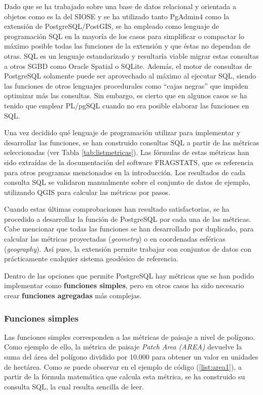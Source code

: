 Dado que se ha trabajado sobre una base de datos relacional y orientada a objetos como es la del SIOSE y se ha utilizado tanto PgAdmin4 como la extensión de PostgreSQL/PostGIS, se ha empleado como lenguaje de programación SQL en la mayoría de los casos para simplificar o compactar lo máximo posible todas las funciones de la extensión y que éstas no dependan de otras. SQL es un lenguaje estandarizado y resultaría viable migrar estas consultas a otros SGBD como Oracle Spatial o SQLite. Además, el motor de consultas de PostgreSQL solamente puede ser aprovechado al máximo al ejecutar SQL, siendo las funciones de otros lenguajes procedurales como ``cajas negras'' que impiden optimizar más las consultas. Sin embargo, es cierto que en algunos casos se ha tenido que emplear PL/pgSQL cuando no era posible elaborar las funciones en SQL.

Una vez decidido qué lenguaje de programación utilizar para implementar y desarrollar las funciones, se han construido consultas SQL a partir de las métricas seleccionadas (ver Tabla \ref{tab:listmetricas}). Las fórmulas de estas métricas han sido extraídas de la documentación del software FRAGSTATS, que es referencia para otros programas mencionados en la introducción. Los resultados de cada consulta SQL se validaron manualmente sobre el conjunto de datos de ejemplo, utilizando QGIS para calcular las métricas por pasos.

Cuando estas últimas comprobaciones han resultado satisfactorias, se ha procedido a desarrollar la función de PostgreSQL por cada una de las métricas. Cabe mencionar que todas las funciones se han desarrollado por duplicado, para calcular las métricas proyectadas (\textit{geometry}) o en coordenadas esféricas (\textit{geography}). Así pues, la extensión permite trabajar con conjuntos de datos con prácticamente cualquier sistema geodésico de referencia.

Dentro de las opciones que permite PostgreSQL hay métricas que se han podido implementar como \textbf{funciones simples}, pero en otros casos ha sido necesario crear \textbf{funciones agregadas} más complejas.

\subsubsection{Funciones simples}

Las funciones simples corresponden a las métricas de paisaje a nivel de polígono. Como ejemplo de ello, la métrica de paisaje \textit{Patch Area (AREA)} devuelve la suma del área del polígono dividido por 10.000 para obtener un valor en unidades de hectárea. Como se puede observar en el ejemplo de código (\ref{list:area1}), a partir de la fórmula matemática que calcula esta métrica, se ha construido su consulta SQL, la cual resulta sencilla de leer.

